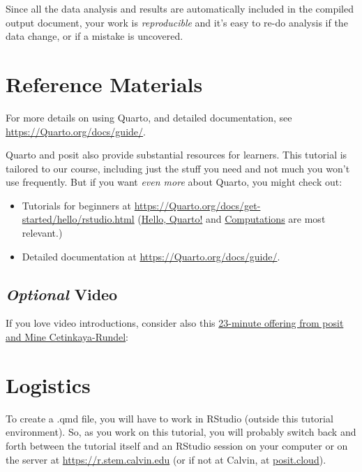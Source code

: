 \documentclass[
  letterpaper,
  DIV=11,
  numbers=noendperiod]{scrreprt}
\providecommand{\tightlist}{%
  \setlength{\itemsep}{0pt}\setlength{\parskip}{0pt}}\usepackage{longtable,booktabs,array}
\theoremstyle{remark}
\begin{document}
Since all the data analysis and results are automatically included in
the compiled output document, your work is \emph{reproducible} and it's
easy to re-do analysis if the data change, or if a mistake is uncovered.

\section{Reference Materials}\label{reference-materials}

For more details on using Quarto, and detailed documentation, see
\url{https://Quarto.org/docs/guide/}.

Quarto and posit also provide substantial resources for learners. This
tutorial is tailored to our course, including just the stuff you need
and not much you won't use frequently. But if you want \emph{even more}
about Quarto, you might check out:

\begin{itemize}
\tightlist
\item
  Tutorials for beginners at
  \url{https://Quarto.org/docs/get-started/hello/rstudio.html}
  (\href{https://Quarto.org/docs/get-started/hello/rstudio.html}{Hello,
  Quarto!} and
  \href{https://Quarto.org/docs/get-started/computations/rstudio.html}{Computations}
  are most relevant.)
\item
  Detailed documentation at \url{https://Quarto.org/docs/guide/}.
\end{itemize}

\subsection{\texorpdfstring{\emph{Optional}
Video}{Optional Video}}\label{optional-video}

If you love video introductions, consider also this
\href{https://youtu.be/_f3latmOhew}{23-minute offering from posit and
Mine Cetinkaya-Rundel}:

\section{Logistics}\label{logistics}

To create a .qmd file, you will have to work in RStudio (outside this
tutorial environment). So, as you work on this tutorial, you will
probably switch back and forth between the tutorial itself and an
RStudio session on your computer or on the server at
\url{https://r.stem.calvin.edu} (or if not at Calvin, at
\href{https://posit.cloud}{posit.cloud}).
\end{document}
